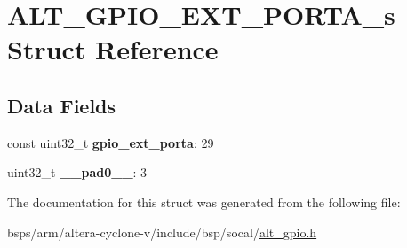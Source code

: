 \hypertarget{structALT__GPIO__EXT__PORTA__s}{}\section{A\+L\+T\+\_\+\+G\+P\+I\+O\+\_\+\+E\+X\+T\+\_\+\+P\+O\+R\+T\+A\+\_\+s Struct Reference}
\label{structALT__GPIO__EXT__PORTA__s}
\subsection*{Data Fields}
\begin{DoxyCompactItemize}
\item 
\mbox{\label{structALT__GPIO__EXT__PORTA__s_a4afa9877dc2d434e6bac50a7a851afe6}} 
const uint32\+\_\+t {\bfseries gpio\+\_\+ext\+\_\+porta}\+: 29
\item 
\mbox{\label{structALT__GPIO__EXT__PORTA__s_ad9215087cc9b477863829bbb7e2463b5}} 
uint32\+\_\+t {\bfseries \+\_\+\+\_\+pad0\+\_\+\+\_\+}\+: 3
\end{DoxyCompactItemize}


The documentation for this struct was generated from the following file\+:\begin{DoxyCompactItemize}
\item 
bsps/arm/altera-\/cyclone-\/v/include/bsp/socal/\mbox{\hyperlink{alt__gpio_8h}{alt\+\_\+gpio.\+h}}\end{DoxyCompactItemize}
